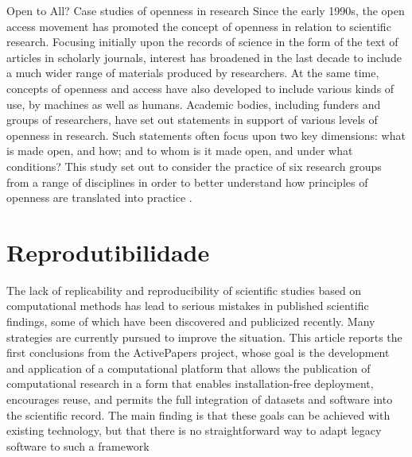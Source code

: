 Open to All?  Case studies of openness in research
Since the early 1990s, the open access movement has promoted the concept of openness in relation
to scientific research. Focusing initially upon the records of science in the form of the text of articles
in scholarly journals, interest has broadened in the last decade to include a much wider range of
materials produced by researchers. At the same time, concepts of openness and access have also
developed to include various kinds of use, by machines as well as humans.
Academic bodies, including funders and groups of researchers, have set out statements in support
of various levels of openness in research. Such statements often focus upon two key dimensions:
what is made open, and how; and to whom is it made open, and under what conditions? This study
set out to consider the practice of six research groups from a range of disciplines in order to better
understand how principles of openness are translated into practice \cite{Nesta2010}.

\section{Reprodutibilidade}


The lack of replicability and reproducibility of scientific studies based on
computational methods has lead to serious mistakes in published scientific
findings, some of which have been discovered and publicized recently. Many
strategies are currently pursued to improve the situation. This article reports the
first conclusions from the ActivePapers project, whose goal is the development
and application of a computational platform that allows the publication of
computational research in a form that enables installation-free deployment,
encourages reuse, and permits the full integration of datasets and software into
the scientific record. The main finding is that these goals can be achieved with
existing technology, but that there is no straightforward way to adapt legacy
software to such a framework \cite{hinsen2014activepapers}

